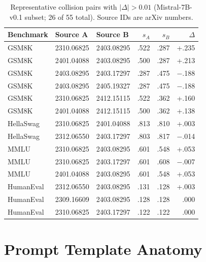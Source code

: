 \documentclass[11pt]{article}
\begin{document}
\begin{table}[t!]
\centering
\footnotesize
\setlength{\tabcolsep}{3.5pt}
\caption{Representative collision pairs with $|\Delta| > 0.01$
(Mistral-7B-v0.1 subset; 26 of 55 total).
Source IDs are arXiv numbers.}
\label{tab:sig_collisions}
\begin{tabular}{ll@{\hspace{6pt}}l@{\hspace{6pt}}rrr}
\toprule
\textbf{Benchmark} & \textbf{Source A} & \textbf{Source B} &
  \textbf{$s_A$} & \textbf{$s_B$} & $\Delta$ \\
\midrule
GSM8K & 2310.06825 & 2403.08295 & .522 & .287 & +.235 \\
GSM8K & 2401.04088 & 2403.08295 & .500 & .287 & +.213 \\
GSM8K & 2403.08295 & 2403.17297 & .287 & .475 & $-$.188 \\
GSM8K & 2403.08295 & 2405.19327 & .287 & .475 & $-$.188 \\
GSM8K & 2310.06825 & 2412.15115 & .522 & .362 & +.160 \\
GSM8K & 2401.04088 & 2412.15115 & .500 & .362 & +.138 \\
\midrule
HellaSwag & 2310.06825 & 2401.04088 & .813 & .810 & +.003 \\
HellaSwag & 2312.06550 & 2403.17297 & .803 & .817 & $-$.014 \\
\midrule
MMLU & 2310.06825 & 2403.08295 & .601 & .548 & +.053 \\
MMLU & 2310.06825 & 2403.17297 & .601 & .608 & $-$.007 \\
MMLU & 2401.04088 & 2403.08295 & .601 & .548 & +.053 \\
\midrule
HumanEval & 2312.06550 & 2403.08295 & .131 & .128 & +.003 \\
HumanEval & 2309.16609 & 2403.08295 & .128 & .128 & .000 \\
HumanEval & 2310.06825 & 2403.17297 & .122 & .122 & .000 \\
\bottomrule
\end{tabular}
\end{table}

\section{Prompt Template Anatomy}
\label{app:prompts}
\end{document}
